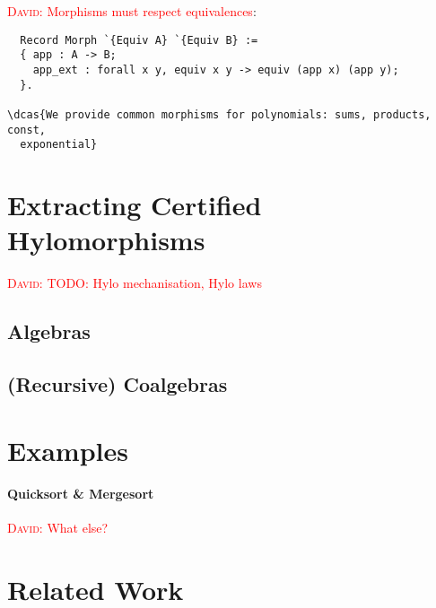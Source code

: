 \documentclass{article}
\newcommand{\dcas}[1]{\textcolor{red}{\textsc{David}: #1}}
\begin{document}
\dcas{Morphisms must respect equivalences}:

\begin{verbatim}
  Record Morph `{Equiv A} `{Equiv B} := 
  { app : A -> B;
    app_ext : forall x y, equiv x y -> equiv (app x) (app y);
  }.

\dcas{We provide common morphisms for polynomials: sums, products, const,
  exponential}

\end{verbatim}

\section{Extracting Certified Hylomorphisms}

\dcas{TODO: Hylo mechanisation, Hylo laws}

\subsection{Algebras}

\subsection{(Recursive) Coalgebras}

\section{Examples}

\paragraph{Quicksort \& Mergesort}

\dcas{What else?}


\section{Related Work}
\end{document}
